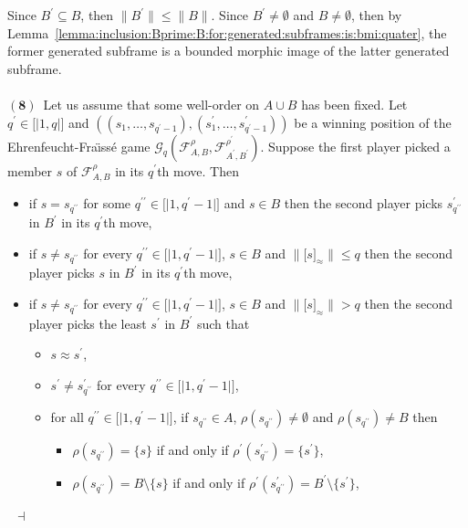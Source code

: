 \documentclass[draft]{article}
\newenvironment{proof}{{\bf Proof:}}{~$\dashv$\\}
\def\lsem{{\lbrack\mid}}
\def\rsem{{\mid\rbrack}}
\begin{document}
\begin{proof}
Since $B^{\prime}{\subseteq}B$, then ${\parallel}B^{\prime}{\parallel}{\leq}{\parallel}B{\parallel}$.
Since $B^{\prime}{\not=}\emptyset$ and $B{\not=}\emptyset$, then by Lemma~\ref{lemma:inclusion:Bprime:B:for:generated:subframes:is:bmi:quater}, the former generated subframe is a bounded morphic image of the latter generated subframe.
%
%
\\
\\
%
%
$\mathbf{(8)}$~Let us assume that some well-order on $A{\cup}B$ has been fixed.
Let $q^{\prime}{\in}\lsem1,q\rsem$ and $((s_{1},\ldots,s_{q^{\prime}{-}1}),(s^{\prime}_{1},\ldots,s^{\prime}_{q^{\prime}{-}1}))$ be a winning position of the Ehrenfeucht-Fra\"\i ss\'e game ${\mathcal G}_{q}({\mathcal F}_{A,B}^{\rho},{\mathcal F}_{A^{\prime},B^{\prime}}^{\rho^{\prime}})$.
Suppose the first player picked a member $s$ of ${\mathcal F}_{A,B}^{\rho}$ in its $q^{\prime}$th move.
Then
%
%
\begin{itemize}
%
%
\item if $s{=}s_{q^{\prime\prime}}$ for some $q^{\prime\prime}{\in}\lsem1,q^{\prime}{-}1\rsem$ and $s{\in}B$ then the second player picks $s^{\prime}_{q^{\prime\prime}}$ in $B^{\prime}$ in its $q^{\prime}$th move,
%
%
\item if $s{\not=}s_{q^{\prime\prime}}$ for every $q^{\prime\prime}{\in}\lsem1,q^{\prime}{-}1\rsem$, $s{\in}B$ and ${\parallel}\lbrack s\rbrack_{\approx}{\parallel}{\leq}q$ then the second player picks $s$ in $B^{\prime}$ in its $q^{\prime}$th move,
%
%
\item if $s{\not=}s_{q^{\prime\prime}}$ for every $q^{\prime\prime}{\in}\lsem1,q^{\prime}{-}1\rsem$, $s{\in}B$ and ${\parallel}\lbrack s\rbrack_{\approx}{\parallel}{>}q$ then the second player picks the least $s^{\prime}$ in $B^{\prime}$ such that
%
%
\begin{itemize}
%
%
\item $s{\approx}s^{\prime}$,
%
%
\item $s^{\prime}{\not=}s^{\prime}_{q^{\prime\prime}}$ for every $q^{\prime\prime}{\in}\lsem1,q^{\prime}{-}1\rsem$,
%
%
\item for all $q^{\prime\prime}{\in}\lsem1,q^{\prime}{-}1\rsem$, if $s_{q^{\prime\prime}}{\in}A$, $\rho(s_{q^{\prime\prime}}){\not=}\emptyset$ and $\rho(s_{q^{\prime\prime}}){\not=}B$ then
%
%
\begin{itemize}
%
%
\item $\rho(s_{q^{\prime\prime}}){=}\{s\}$ if and only if $\rho^{\prime}(s^{\prime}_{q^{\prime\prime}}){=}\{s^{\prime}\}$,
%
%
\item $\rho(s_{q^{\prime\prime}}){=}B{\setminus}\{s\}$ if and only if $\rho^{\prime}(s^{\prime}_{q^{\prime\prime}}){=}B^{\prime}{\setminus}\{s^{\prime}\}$,

\end{itemize}
\end{itemize}
\end{itemize}
\end{proof}
\end{document}
